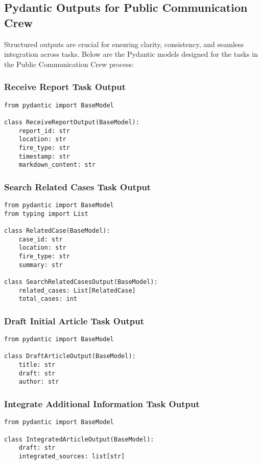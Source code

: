 \subsection{Pydantic Outputs for Public Communication Crew}

Structured outputs are crucial for ensuring clarity, consistency, and seamless integration across tasks. Below are the Pydantic models designed for the tasks in the Public Communication Crew process:

\subsubsection{Receive Report Task Output}
\begin{lstlisting}[caption={Pydantic model for Receive Report Task Output}]
from pydantic import BaseModel

class ReceiveReportOutput(BaseModel):
    report_id: str
    location: str
    fire_type: str
    timestamp: str
    markdown_content: str
\end{lstlisting}

\subsubsection{Search Related Cases Task Output}
\begin{lstlisting}[caption={Pydantic model for Search Related Cases Task Output}]
from pydantic import BaseModel
from typing import List

class RelatedCase(BaseModel):
    case_id: str
    location: str
    fire_type: str
    summary: str

class SearchRelatedCasesOutput(BaseModel):
    related_cases: List[RelatedCase]
    total_cases: int
\end{lstlisting}

\subsubsection{Draft Initial Article Task Output}
\begin{lstlisting}[caption={Pydantic model for Draft Initial Article Task Output}]
from pydantic import BaseModel

class DraftArticleOutput(BaseModel):
    title: str
    draft: str
    author: str
\end{lstlisting}

\subsubsection{Integrate Additional Information Task Output}
\begin{lstlisting}[caption={Pydantic model for Integrate Additional Information Task Output}]
from pydantic import BaseModel

class IntegratedArticleOutput(BaseModel):
    draft: str
    integrated_sources: list[str]
\end{lstlisting}

